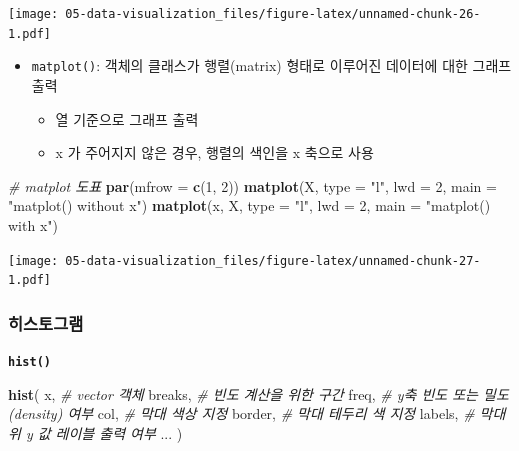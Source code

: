 \documentclass[
  11pt,
]{krantz}
\newenvironment{Shaded}{\begin{snugshade}}{\end{snugshade}}
\newcommand{\CommentTok}[1]{\textcolor[rgb]{0.37,0.37,0.37}{\textit{#1}}}
\newcommand{\DataTypeTok}[1]{\textcolor[rgb]{0.27,0.27,0.27}{#1}}
\newcommand{\DecValTok}[1]{\textcolor[rgb]{0.06,0.06,0.06}{#1}}
\newcommand{\KeywordTok}[1]{\textcolor[rgb]{0.27,0.27,0.27}{\textbf{#1}}}
\newcommand{\NormalTok}[1]{#1}
\newcommand{\StringTok}[1]{\textcolor[rgb]{0.5,0.5,0.5}{#1}}
\providecommand{\tightlist}{%
  \setlength{\itemsep}{0pt}\setlength{\parskip}{0pt}}
\begin{document}
\texttt{[image: 05-data-visualization\_files/figure-latex/unnamed-chunk-26-1.pdf]}

\normalsize

\begin{itemize}
\tightlist
\item
  \texttt{matplot()}: 객체의 클래스가 행렬(matrix) 형태로 이루어진 데이터에 대한 그래프 출력

  \begin{itemize}
  \tightlist
  \item
    열 기준으로 그래프 출력
  \item
    x 가 주어지지 않은 경우, 행렬의 색인을 x 축으로 사용
  \end{itemize}
\end{itemize}

\footnotesize

\begin{Shaded}
\begin{Highlighting}[]
\CommentTok{# matplot 도표}
\KeywordTok{par}\NormalTok{(}\DataTypeTok{mfrow =} \KeywordTok{c}\NormalTok{(}\DecValTok{1}\NormalTok{, }\DecValTok{2}\NormalTok{))}
\KeywordTok{matplot}\NormalTok{(X, }\DataTypeTok{type =} \StringTok{"l"}\NormalTok{, }
        \DataTypeTok{lwd =} \DecValTok{2}\NormalTok{, }
        \DataTypeTok{main =} \StringTok{"matplot() without x"}\NormalTok{)}
\KeywordTok{matplot}\NormalTok{(x, X, }\DataTypeTok{type =} \StringTok{"l"}\NormalTok{, }
        \DataTypeTok{lwd =} \DecValTok{2}\NormalTok{, }
        \DataTypeTok{main =} \StringTok{"matplot() with x"}\NormalTok{)}
\end{Highlighting}
\end{Shaded}

\texttt{[image: 05-data-visualization\_files/figure-latex/unnamed-chunk-27-1.pdf]}

\normalsize

\hypertarget{histogram}{%
\subsubsection*{히스토그램}\label{histogram}}


\textbf{\texttt{hist()}}

\footnotesize

\begin{Shaded}
\begin{Highlighting}[]
\KeywordTok{hist}\NormalTok{(}
\NormalTok{  x, }\CommentTok{# vector 객체}
\NormalTok{  breaks, }\CommentTok{# 빈도 계산을 위한 구간}
\NormalTok{  freq, }\CommentTok{# y축 빈도 또는 밀도(density) 여부}
\NormalTok{  col, }\CommentTok{# 막대 색상 지정}
\NormalTok{  border, }\CommentTok{# 막대 테두리 색 지정}
\NormalTok{  labels, }\CommentTok{# 막대 위 y 값 레이블 출력 여부 }
\NormalTok{  ...}
\NormalTok{)}
\end{Highlighting}
\end{Shaded}
\end{document}
